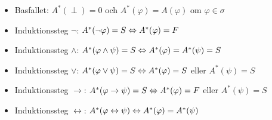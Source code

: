 \begin{itemize}
  \item Basfallet: $A^*(\perp)=0$ och $A^*(\varphi)=A(\varphi)$ om $\varphi\in\sigma$
    \par\bigskip

  \item Induktionssteg $\neg$: $A^*(\neg\varphi) = S \Leftrightarrow A^*(\varphi) = F$
    \par\bigskip

  \item Induktionssteg $\wedge$: $A^*(\varphi\wedge\psi) = S \Leftrightarrow A^*(\varphi)=A^*(\psi)=S$
    \par\bigskip

  \item Induktionssteg $\vee$: $A^*(\varphi\vee\psi) = S \Leftrightarrow A^*(\varphi)=S$ eller $A^*(\psi)=S$
    \par\bigskip

  \item Induktionssteg $\rightarrow$: $A^*(\varphi\rightarrow\psi) = S \Leftrightarrow A^*(\varphi)=F$ eller $A^*(\psi)=S$
    \par\bigskip

  \item Induktionssteg $\leftrightarrow$: $A^*(\varphi\leftrightarrow\psi)\Leftrightarrow A^*(\varphi)=A^*(\psi)$
\end{itemize}

